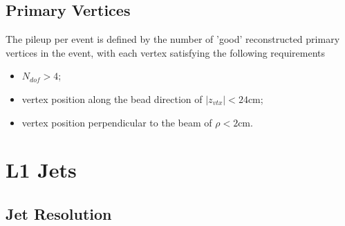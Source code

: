 \section{Primary Vertices}

\label{app:primaryvertices}

The pileup per event is defined by the number of 'good' reconstructed primary vertices in the event, with each vertex satisfying the following requirements

\begin{itemize}
	\item $N_{dof} > 4$;
	\item vertex position along the bead direction of $\vert z_{vtx} \vert < 24$cm; 
	\item vertex position perpendicular to the beam of $\rho < 2$cm.

\end{itemize}


\chapter{L1 Jets}

\section{Jet Resolution}
\label{app:jetpuresolution}

\begin{figure}[htp]

    \centering
    \,
     \,
\end{figure}

